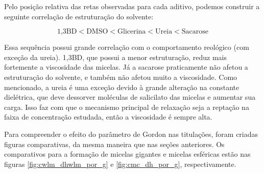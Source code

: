 		Pelo posição relativa das retas observadas para cada aditivo, podemos construir a seguinte correlação de estruturação do solvente:
		
		\begin{equation*}
			\textrm{1,3BD} < \textrm{DMSO} < \textrm{Glicerina} < \textrm{Ureia} < \textrm{Sacarose}
		\end{equation*}
		
		Essa sequência possui grande correlação com o comportamento reológico (com exceção da ureia). 1,3BD, que possui a menor estruturação, reduz mais fortemente a viscosidade das micelas. Já a sacarose praticamente não afetou a estruturação do solvente, e também não afetou muito a viscosidade. Como mencionado, a ureia é uma exceção devido à grande alteração na constante dielétrica, que deve dessorver moléculas de salicilato das micelas e aumentar sua carga. Isso faz com que o mecanismo principal de relaxação seja a reptação na faixa de concentração estudada, então a viscosidade é sempre alta.
		
		Para compreender o efeito do parâmetro de Gordon nas titulações, foram criadas figuras comparativas, da mesma maneira que nas seções anteriores. Os comparativos para a formação de micelas gigantes e micelas esféricas estão nas figuras \ref{fig:cwlm_dhwlm_por_g} e \ref{fig:cmc_dh_por_g}, respectivamente.
		
